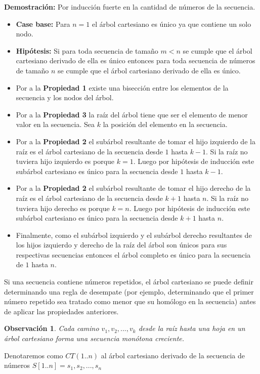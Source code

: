 \documentclass[12pt]{article}
\newcommand{\proof}{\textbf{Demostración:} }
\newcommand{\ct}{árbol cartesiano }
\newtheorem{observation}{Observación}
\begin{document}
\proof Por inducción fuerte en la cantidad de números de la secuencia.
\begin{itemize}
	\item \textbf{Case base:} Para $n = 1$ el \ct es único ya que contiene un solo nodo.
	\item \textbf{Hipótesis:} Si para toda secuencia de tamaño $m < n$ se cumple que el \ct derivado de ella es único entonces para toda secuencia de números de tamaño $n$ se cumple que el \ct derivado de ella es único.
	\item Por a la \textbf{Propiedad 1} existe una bisección entre los elementos de la secuencia y los nodos del árbol.
	\item Por a la \textbf{Propiedad 3} la raíz del árbol tiene que ser el elemento de menor valor en la secuencia. Sea $k$ la posición del elemento en la secuencia.
	\item Por a la \textbf{Propiedad 2} el subárbol resultante de tomar el hijo izquierdo de la raíz es el \ct de la secuencia desde $1$ hasta $k - 1$. Si la raíz no tuviera hijo izquierdo es porque $k = 1$. Luego por hipótesis de inducción este subárbol cartesiano es único para la secuencia desde $1$ hasta $k - 1$.
	\item Por a la \textbf{Propiedad 2} el subárbol resultante de tomar el hijo derecho de la raíz es el \ct de la secuencia desde $k + 1$ hasta $n$. Si la raíz no tuviera hijo derecho es porque $k = n$. Luego por hipótesis de inducción este subárbol cartesiano es único para la secuencia desde $k + 1$ hasta $n$.
	\item Finalmente, como el subárbol izquierdo y el subárbol derecho resultantes de los hijos izquierdo y derecho de la raíz del árbol son únicos para sus respectivas secuencias entonces el árbol completo es único para la secuencia de $1$ hasta $n$. 
\end{itemize}

Si una secuencia contiene números repetidos, el \ct se puede definir determinando una regla de desempate (por ejemplo, determinando que el primer número repetido sea tratado como menor que su homólogo en la secuencia) antes de aplicar las propiedades anteriores.

\begin{observation}
	Cada camino $v_1, v_2, ... , v_k$ desde la raíz hasta una hoja en un \ct forma una secuencia monótona creciente.
\end{observation}

Denotaremos como $CT(1..n)$ al \ct derivado de la secuencia de números $S[1..n] = s_1, s_2, ... , s_n$
\end{document}
